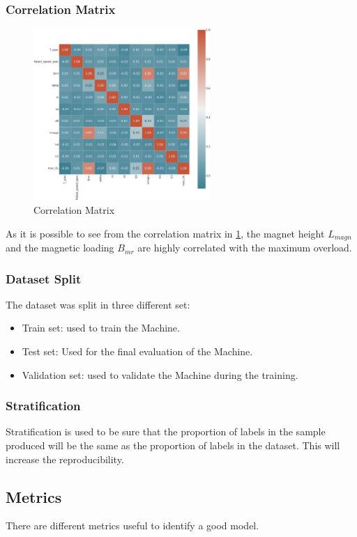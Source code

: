 \subsubsection{Correlation Matrix}
\begin{figure}[H]
    \centering
    \includegraphics[width=0.6\textwidth]{sections/images/section3/correlation_matrix.png}
    \caption{Correlation Matrix}
    \label{fig:corr_matrix}
\end{figure}
As it is possible to see from the correlation matrix in \cref{fig:corr_matrix}, the magnet height $L_{magn}$ and the magnetic loading $B_{mr}$ are highly correlated with the maximum overload.
\subsubsection{Dataset Split}
The dataset was split in three different set: 
\begin{itemize}
    \item Train set: used to train the Machine.
    \item Test set: Used for the final evaluation of the Machine.
    \item Validation set: used to validate the Machine during the training.
\end{itemize}
\subsubsection{Stratification}
Stratification is used to be sure that the proportion of labels in the sample produced will be the same as the proportion of labels in the dataset. This will increase the reproducibility.
\subsection{Metrics}
There are different metrics useful to identify a good model.

